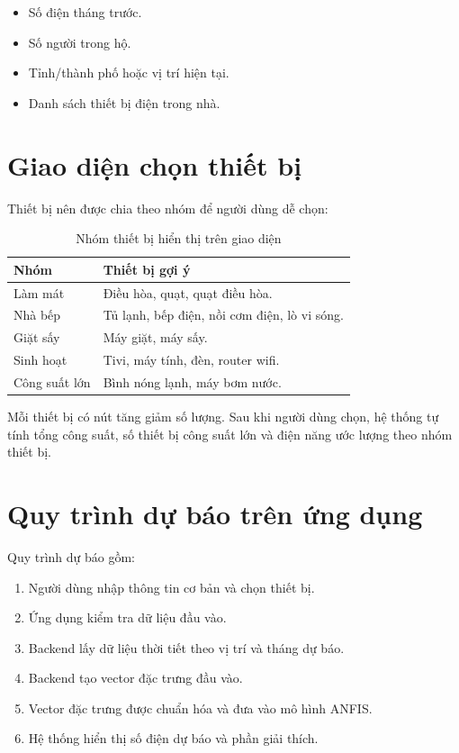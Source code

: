 \begin{itemize}[leftmargin=1.2cm]
  \item Số điện tháng trước.
  \item Số người trong hộ.
  \item Tỉnh/thành phố hoặc vị trí hiện tại.
  \item Danh sách thiết bị điện trong nhà.
\end{itemize}

\section{Giao diện chọn thiết bị}

Thiết bị nên được chia theo nhóm để người dùng dễ chọn:

\begin{table}[H]
  \centering
  \caption{Nhóm thiết bị hiển thị trên giao diện}
  \begin{tabular}{p{4cm} p{9cm}}
    \toprule
    \textbf{Nhóm} & \textbf{Thiết bị gợi ý} \\
    \midrule
    Làm mát & Điều hòa, quạt, quạt điều hòa. \\
    Nhà bếp & Tủ lạnh, bếp điện, nồi cơm điện, lò vi sóng. \\
    Giặt sấy & Máy giặt, máy sấy. \\
    Sinh hoạt & Tivi, máy tính, đèn, router wifi. \\
    Công suất lớn & Bình nóng lạnh, máy bơm nước. \\
    \bottomrule
  \end{tabular}
\end{table}

Mỗi thiết bị có nút tăng giảm số lượng. Sau khi người dùng chọn, hệ thống tự tính tổng công suất, số thiết bị công suất lớn và điện năng ước lượng theo nhóm thiết bị.

\section{Quy trình dự báo trên ứng dụng}

Quy trình dự báo gồm:

\begin{enumerate}[leftmargin=1.2cm]
  \item Người dùng nhập thông tin cơ bản và chọn thiết bị.
  \item Ứng dụng kiểm tra dữ liệu đầu vào.
  \item Backend lấy dữ liệu thời tiết theo vị trí và tháng dự báo.
  \item Backend tạo vector đặc trưng đầu vào.
  \item Vector đặc trưng được chuẩn hóa và đưa vào mô hình ANFIS.
  \item Hệ thống hiển thị số điện dự báo và phần giải thích.
\end{enumerate}

